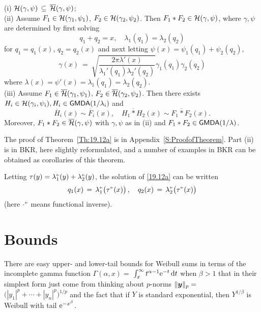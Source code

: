 \begin{theorem}\label{Th:19.12a}
{\rm (i)} ${\mathcal H}(\gamma,\psi)\,\subseteq\,\overline{\mathcal H}(\gamma,\psi)$;\\
 {\rm (ii)} Assume $F_1\in {\mathcal H}(\gamma_1,\psi_1)$, $F_2\in {\mathcal H}(\gamma_2,\psi_2)$. Then
 $F_1*F_2\in{\mathcal H}(\gamma,\psi)$,
 where $\gamma,\psi$ are determined by first solving
 \begin{equation}\label{19.12a} q_1+q_2=x,\quad \lambda_1(q_1)=\lambda_2(q_2) \end{equation}
 for $q_1=q_1(x)$, $q_2=q_2(x)$ and next letting $\psi(x)=\psi_1(q_1)+\psi_2(q_2)$,
 \[\gamma(x)\ =\ \sqrt{ \frac{2\pi \lambda'(x)}{\lambda_1'(q_1) \lambda_2'(q_2)}}
\gamma_1(q_1)\gamma_2(q_2)
 \]
 where $\lambda(x)=\psi'(x)=\lambda_1(q_1)=\lambda_2(q_2)$.\\
  {\rm (iii)} Assume $F_1\in \overline{\mathcal H}(\gamma_1,\psi_1)$, $F_2\in \overline{\mathcal H}(\gamma_2,\psi_2)$. Then
	there exists $H_i \in  {\mathcal H}(\gamma_i,\psi_i), H_i \in \mathsf{GMDA}(1/\lambda_i)$ and
	$$\overline H_i(x) \sim \overline F_i(x), \quad \overline{H_1*H_2}(x) \sim
	\overline{F_1*F_2}(x)  .$$
Moreover,   $F_1*F_2\in\overline{\mathcal H}(\gamma,\psi)$ with $\gamma,\psi$ as in {\rm (ii)} and
$F_1*F_2\in \mathsf{GMDA}(1/\lambda)$.
\end{theorem}

The proof of Theorem~\ref{Th:19.12a} is in Appendix~\ref{S:ProofofTheorem}.
Part (ii) is in BKR, here slightly reformulated, and
a number of examples in BKR can be obtained as corollaries of this theorem.

\begin{remark}\label{Rem:19.12a}
Letting $\tau(y)=\lambda_1^{{\ginv}}(y)+\lambda_2^{{\ginv}}(y)$, the solution of \eqref{19.12a} can be written
\begin{equation}\label{19.12aa} q_1(x)\,=\,\lambda_1^{{\ginv}}\bigl(\tau^{{\ginv}}(x)\bigr) \,,\quad
q_2(x)\,=\,\lambda_2^{{\ginv}}\bigl(\tau^{{\ginv}}(x)\bigr)\end{equation}
(here $\cdot^{{\ginv}}$ means functional inverse).
\halmoss\end{remark}

\section{Bounds}\label{S:Bounds}

There are easy upper- and lower-tail bounds for Weibull sums in terms of
the incomplete gamma function $\Gamma(\alpha,x)=$
$\int_x^\infty t^{\alpha-1} \mathrm{e}^{-t}\,\mathrm{d} t$ when $\beta> 1$ that in their simplest form just come from thinking
about $p$-norms  $\|\bm{y}\|_p= $ $\bigl(|y_1|^p+\cdots+|y_n|^p\bigr)^{1/p}$ and the  fact that if $Y$ is standard exponential,
then $Y^{1/\beta }$ is Weibull with tail $\mathrm{e}^{-x^\beta}$.


